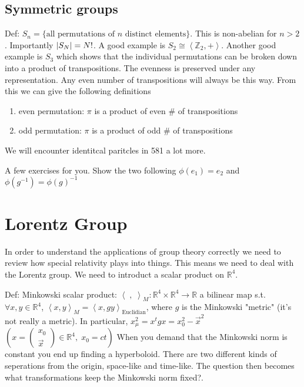 \subsection{Symmetric groups}
Def: $S_n = \{ \text{all permutations of } n \text{ distinct elements}\}$. This is non-abelian
for $n > 2$. Importantly $\abs*{S_N} = N!$. A good example is
$S_2 \cong \left< \mathbb{Z}_2, +\right>$. Another good example is $S_3$ which shows that
the individual permutations can be broken down into a product of transpositions. The evenness
is preserved under any representation. Any even number of transpositions will always be this way.
From this we can give the following definitions
\begin{enumerate}
    \item even permutation: $\pi$ is a product of even \# of transpositions
    \item odd permutation: $\pi$ is a product of odd \# of transpositions
\end{enumerate}
We will encounter identitcal paritcles in 581 a lot more. 

{\color{green} A few exercises for you. Show the two following $\phi(e_1) = e_2$ and
$\phi(g^{-1}) = \phi(g)^{-1}$}

\section{Lorentz Group}
In order to understand the applications of group theory correctly we need to review
how special relativity plays into things. This means we need to deal with the Lorentz group.
We need to introduct a scalar product on $\mathbb{R}^4$.

Def: Minkowski scalar product: 
$\left<\;,\;\right>_M: \mathbb{R}^4 \times \mathbb{R}^4 \rightarrow \mathbb{R}$ 
a bilinear map s.t.
$\forall x, y \in \mathbb{R}^4$, 
$\left<x, y\right>_M = \left<x, gy\right>_{\text{Euclidian}}$, where $g$ is the
Minkowski "metric" (it's not really a metric). In particular,
$x_{\mu}^2 = x^t g x = x_0^2 - \vec{x}^2$ 
$\left(x = \begin{pmatrix} x_0 \\ \vec{x} \end{pmatrix} \in \mathbb{R}^4, \;x_0 = ct\right)$
When you demand that the Minkowski norm is constant you end up finding a hyperboloid. There
are two different kinds of seperations from the origin, space-like and time-like. The question
then becomes {\color{red} what transformations keep the Minkowski norm fixed?}.

